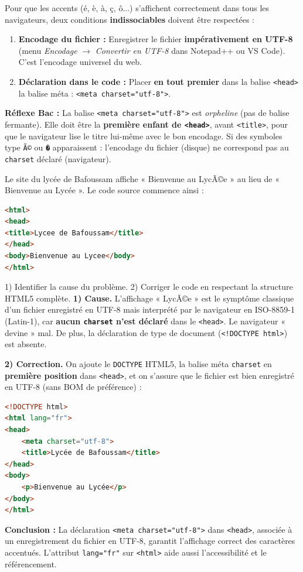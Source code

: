 \documentclass[11pt]{article}
\begin{document}
\begin{methode}
Pour que les accents (é, è, à, ç, ô...) s'affichent correctement dans tous les navigateurs, deux conditions \textbf{indissociables} doivent être respectées :
\begin{enumerate}
  \item \textbf{Encodage du fichier :} Enregistrer le fichier \textbf{impérativement en UTF-8} (menu \emph{Encodage} $\to$ \emph{Convertir en UTF-8} dans Notepad++ ou VS Code). C'est l'encodage universel du web.
  \item \textbf{Déclaration dans le code :} Placer \textbf{en tout premier} dans la balise \texttt{<head>} la balise méta : \texttt{<meta charset="utf-8">}.
\end{enumerate}
\textbf{Réflexe Bac :} La balise \texttt{<meta charset="utf-8">} est \emph{orpheline} (pas de balise fermante). Elle doit être la \textbf{première enfant de \texttt{<head>}}, avant \texttt{<title>}, pour que le navigateur lise le titre lui-même avec le bon encodage. Si des symboles type \texttt{Ã©} ou \texttt{�} apparaissent : l'encodage du fichier (disque) ne correspond pas au \texttt{charset} déclaré (navigateur).
\end{methode}

\begin{exoresolu}
Le site du lycée de Bafoussam affiche « Bienvenue au LycÃ©e » au lieu de « Bienvenue au Lycée ». Le code source commence ainsi :
\begin{lstlisting}[language=HTML]
<html>
<head>
<title>Lycee de Bafoussam</title>
</head>
<body>Bienvenue au Lycee</body>
</html>
\end{lstlisting}
1) Identifier la cause du problème. 2) Corriger le code en respectant la structure HTML5 complète.
\tcblower
\textbf{1) Cause.} L'affichage « LycÃ©e » est le symptôme classique d'un fichier enregistré en UTF-8 mais interprété par le navigateur en ISO-8859-1 (Latin-1), car \textbf{aucun \texttt{charset} n'est déclaré} dans le \texttt{<head>}. Le navigateur « devine » mal. De plus, la déclaration de type de document (\texttt{<!DOCTYPE html>}) est absente.

\textbf{2) Correction.} On ajoute le \texttt{DOCTYPE} HTML5, la balise méta \texttt{charset} en \textbf{première position} dans \texttt{<head>}, et on s'assure que le fichier est bien enregistré en UTF-8 (sans BOM de préférence) :
\begin{lstlisting}[language=HTML]
<!DOCTYPE html>
<html lang="fr">
<head>
    <meta charset="utf-8">
    <title>Lycée de Bafoussam</title>
</head>
<body>
    <p>Bienvenue au Lycée</p>
</body>
</html>
\end{lstlisting}
\textbf{Conclusion :} La déclaration \texttt{<meta charset="utf-8">} dans \texttt{<head>}, associée à un enregistrement du fichier en UTF-8, garantit l'affichage correct des caractères accentués. L'attribut \texttt{lang="fr"} sur \texttt{<html>} aide aussi l'accessibilité et le référencement.
\end{exoresolu}
\end{document}
